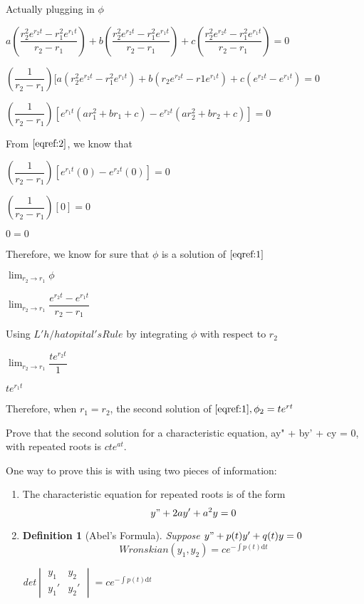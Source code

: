 \documentclass{article}
\newtheorem{definition}{Definition}
\begin{document}
Actually plugging in $\phi$
\begin{center}
$a(\dfrac{r_2^2e^{r_2t}-r_1^2e^{r_1t}}{r_2-r_1}) + b(\dfrac{r_2^2e^{r_2t}-r_1^2e^{r_1t}}{r_2-r_1}) + c(\dfrac{r_2^2e^{r_2t}-r_1^2e^{r_1t}}{r_2-r_1}) = 0$

$(\dfrac{1}{r_2-r_1})[a(r_2^2e^{r_2t}-r_1^2e^{r_1t}) + b(r_2e^{r_2t}-r1e^{r_1t}) + c(e^{r_2t}-e^{r_1t}) = 0$

$(\dfrac{1}{r_2-r_1})[e^{r_1t}(ar_1^2 +br_1 + c) - e^{r_2t}(ar_2^2 + br_2 + c)]=0$
\end{center}

From $\eqref{eqref:2}$, we know that

\begin{center}
$(\dfrac{1}{r_2-r_1})[e^{r_1t}(0) - e^{r_2t}(0)]=0$

$(\dfrac{1}{r_2-r_1})[0]=0$

$0 = 0$
\end{center}

Therefore, we know for sure that $\phi$ is a solution of $\eqref{eqref:1}$

\begin{center}
$ \lim_{r_2 \rightarrow r_1} \phi $

$  \lim_{r_2 \rightarrow r_1} \dfrac{e^{r_2t}-e^{r_1t}}{r_2-r_1} $
\end{center}

Using $L'h/hat{o}pital's Rule$ by integrating $\phi$ with respect to $r_2$

\begin{center}
$  \lim_{r_2 \rightarrow r_1} \dfrac{te^{r_2t}}{1} $


$te^{r_1t}$
\end{center}
Therefore, when $r_1 = r_2$, the second solution of $\eqref{eqref:1}, \phi_2 = te^{rt}$

\newpage

Prove that the second solution for a characteristic equation, ay" + by' + cy = 0, with repeated roots is $cte^{at}$.

One way to prove this is with using two pieces of information:

\begin{enumerate}
\item The characteristic equation for repeated roots is of the form 
\begin{equation} \label{eqref:10}
y" + 2ay' + a^2y = 0
\end{equation}
\item \begin{definition} [Abel's Formula]
Suppose $ y" + p(t)y' + q(t)y = 0$
\begin{equation}
Wronskian(y_1, y_2) = ce^{-\int p(t) \mathrm{d}t} 
\end{equation}
\begin{center}
det$
\begin{vmatrix}
y_1 & y_2\\
y_1' & y_2'
\end{vmatrix}
= ce^{-\int p(t) \mathrm{d}t}
$
\end{center}
\end{definition}
\end{enumerate}
\end{document}
